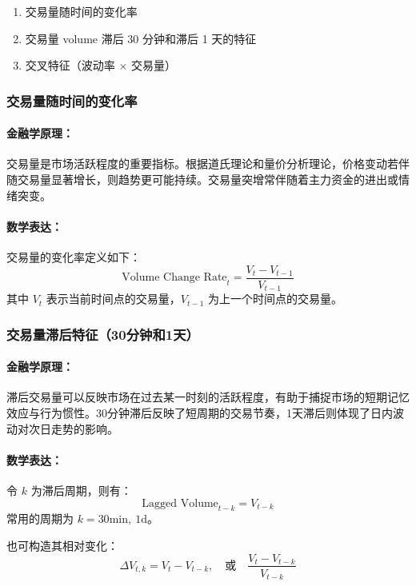 \documentclass[a4paper,12pt]{ctexart}
\begin{document}
\begin{enumerate}
    \item 交易量随时间的变化率
    \item 交易量 volume 滞后 30 分钟和滞后 1 天的特征
    \item 交叉特征（波动率 $\times$ 交易量）
\end{enumerate}

\subsubsection{交易量随时间的变化率}

\paragraph{金融学原理：}

交易量是市场活跃程度的重要指标。根据道氏理论和量价分析理论，价格变动若伴随交易量显著增长，则趋势更可能持续。交易量突增常伴随着主力资金的进出或情绪突变。

\paragraph{数学表达：}

交易量的变化率定义如下：
\[
\text{Volume Change Rate}_t = \frac{V_t - V_{t-1}}{V_{t-1}}
\]
其中 $V_t$ 表示当前时间点的交易量，$V_{t-1}$ 为上一个时间点的交易量。

\subsubsection{交易量滞后特征（30分钟和1天）}

\paragraph{金融学原理：}

滞后交易量可以反映市场在过去某一时刻的活跃程度，有助于捕捉市场的短期记忆效应与行为惯性。30分钟滞后反映了短周期的交易节奏，1天滞后则体现了日内波动对次日走势的影响。

\paragraph{数学表达：}

令 $k$ 为滞后周期，则有：
\[
\text{Lagged Volume}_{t-k} = V_{t-k}
\]
常用的周期为 $k = 30\text{min},\ 1\text{d}$。

也可构造其相对变化：
\[
\Delta V_{t,k} = V_t - V_{t-k}, \quad \text{或} \quad \frac{V_t - V_{t-k}}{V_{t-k}}
\]
\end{document}
